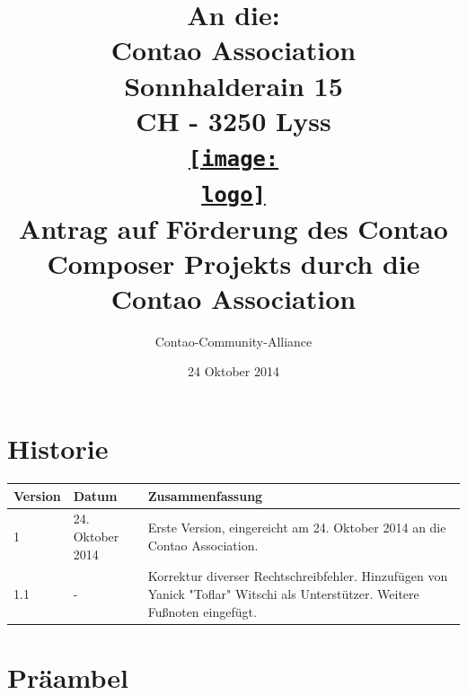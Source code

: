 \documentclass[
paper=a4,
draft=false,%
fontsize=10pt%
]{scrartcl}
\def\logo{logos/colorlogo_rgb}%
\begin{document}
\title{%
An die:\\
Contao Association\\
Sonnhalderain 15\\
CH - 3250 Lyss\\
\href{http://c-c-a.org}{\texttt{[image: \\logo]}}\\
Antrag auf Förderung des Contao Composer Projekts durch die Contao Association\\%
}
\date{24 Oktober 2014}
\author{Contao-Community-Alliance}
\maketitle

\pagebreak

%
%

\section*{Historie}
\label{sec:history}

\begin{tabular*}{\textwidth}{@{\extracolsep{\fill} }llp{}}
\textbf{Version} & \textbf{Datum} & \textbf{Zusammenfassung} \\
\hline
1   & 24. Oktober 2014 & Erste Version, eingereicht am 24. Oktober 2014 an die Contao Association. \\
\hline
1.1 & -                & Korrektur diverser Rechtschreibfehler. \newline
                         Hinzufügen von Yanick "Toflar" Witschi als Unterstützer. \newline
                         Weitere Fußnoten eingefügt. \\
\end{tabular*}

\pagebreak

%
%

\section*{Präambel}
\label{sec:preamble}
\end{document}
